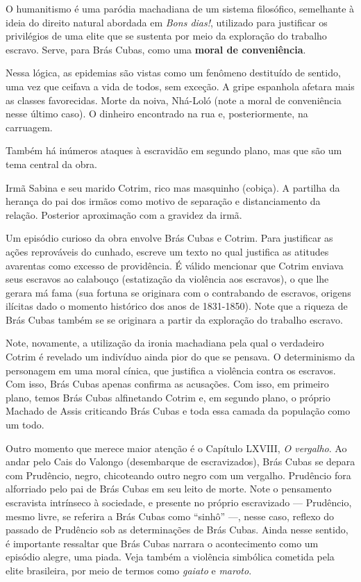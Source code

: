 O humanitismo é uma paródia machadiana de um sistema filosófico, semelhante à ideia do direito natural abordada em \textit{Bons dias!}, utilizado para justificar os privilégios de uma elite que se sustenta por meio da exploração do trabalho escravo. Serve, para Brás Cubas, como uma \textbf{moral de conveniência}.

Nessa lógica, as epidemias são vistas como um fenômeno destituído de sentido, uma vez que ceifava a vida de todos, sem exceção. A gripe espanhola afetara mais as classes favorecidas. Morte da noiva, Nhá-Loló (note a moral de conveniência nesse último caso). O dinheiro encontrado na rua e, posteriormente, na carruagem.

Também há inúmeros ataques à escravidão em segundo plano, mas que são um tema central da obra.

Irmã Sabina e seu marido Cotrim, rico mas masquinho (cobiça). A partilha da herança do pai dos irmãos como motivo de separação e distanciamento da relação. Posterior aproximação com a gravidez da irmã.

Um episódio curioso da obra envolve Brás Cubas e Cotrim. Para justificar as ações reprováveis do cunhado, escreve um texto no qual justifica as atitudes avarentas como excesso de providência. É válido mencionar que Cotrim enviava seus escravos ao calabouço (estatização da violência aos escravos), o que lhe gerara má fama (sua fortuna se originara com o contrabando de escravos, origens ilícitas dado o momento histórico dos anos de 1831-1850). Note que a riqueza de Brás Cubas também se se originara a partir da exploração do trabalho escravo.

Note, novamente, a utilização da ironia machadiana pela qual o verdadeiro Cotrim é revelado um indivíduo ainda pior do que se pensava. O determinismo da personagem em uma moral cínica, que justifica a violência contra os escravos. Com isso, Brás Cubas apenas confirma as acusações. Com isso, em primeiro plano, temos Brás Cubas alfinetando Cotrim e, em segundo plano, o próprio Machado de Assis criticando Brás Cubas e toda essa camada da população como um todo.

Outro momento que merece maior atenção é o Capítulo LXVIII, \textit{O vergalho}. Ao andar pelo Cais do Valongo (desembarque de escravizados), Brás Cubas se depara com Prudêncio, negro, chicoteando outro negro com um vergalho. Prudêncio fora alforriado pelo pai de Brás Cubas em seu leito de morte. Note o pensamento escravista intrínseco à sociedade, e presente no próprio escravizado — Prudêncio, mesmo livre, se referira a Brás Cubas como ``sinhô'' —, nesse caso, reflexo do passado de Prudêncio sob as determinações de Brás Cubas. Ainda nesse sentido, é importante ressaltar que Brás Cubas narrara o acontecimento como um episódio alegre, uma piada. Veja também a violência simbólica cometida pela elite brasileira, por meio de termos como \textit{gaiato} e \textit{maroto}.

